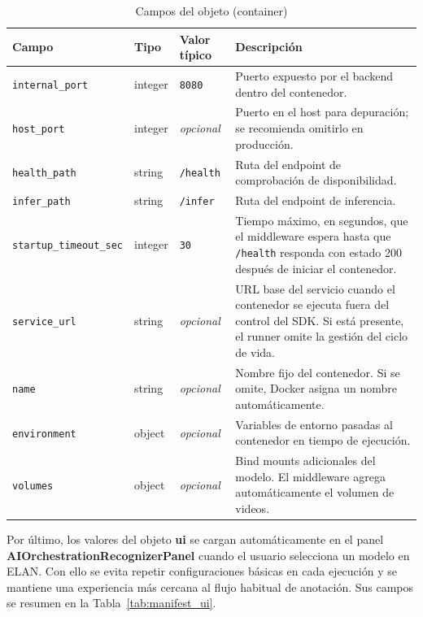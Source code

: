 \documentclass[11pt,a4paper]{article}
\begin{document}
\begin{table}[H]
\centering
\caption{Campos del objeto (container)}
\label{tab:manifest_container}
\scriptsize
\renewcommand{\arraystretch}{1.08}
\setlength{\tabcolsep}{3.5pt}

\begin{tabular}{
    >{\raggedright\arraybackslash}p{3.3cm}
    >{\raggedright\arraybackslash}p{1.5cm}
    >{\raggedright\arraybackslash}p{2.4cm}
    >{\raggedright\arraybackslash}p{6.0cm}
}
\toprule
\textbf{Campo} & \textbf{Tipo} & \textbf{Valor típico} & \textbf{Descripción} \\
\midrule
\texttt{internal\_port} & integer & \texttt{8080} & Puerto expuesto por el backend dentro del contenedor. \\
\texttt{host\_port} & integer & \textit{opcional} & Puerto en el host para depuración; se recomienda omitirlo en producción. \\
\texttt{health\_path} & string & \texttt{/health} & Ruta del endpoint de comprobación de disponibilidad. \\
\texttt{infer\_path} & string & \texttt{/infer} & Ruta del endpoint de inferencia. \\
\texttt{startup\_timeout\_sec} & integer & \texttt{30} & Tiempo máximo, en segundos, que el middleware espera hasta que \texttt{/health} responda con estado 200 después de iniciar el contenedor. \\
\texttt{service\_url} & string & \textit{opcional} & URL base del servicio cuando el contenedor se ejecuta fuera del control del SDK. Si está presente, el runner omite la gestión del ciclo de vida. \\
\texttt{name} & string & \textit{opcional} & Nombre fijo del contenedor. Si se omite, Docker asigna un nombre automáticamente. \\
\texttt{environment} & object & \textit{opcional} & Variables de entorno pasadas al contenedor en tiempo de ejecución. \\
\texttt{volumes} & object & \textit{opcional} & Bind mounts adicionales del modelo. El middleware agrega automáticamente el volumen de videos. \\
\bottomrule
\end{tabular}
\end{table}

Por último, los valores del objeto \textbf{ui} se cargan automáticamente en el panel \textbf{AIOrchestrationRecognizerPanel} cuando el usuario selecciona un modelo en ELAN. Con ello se evita repetir configuraciones básicas en cada ejecución y se mantiene una experiencia más cercana al flujo habitual de anotación. Sus campos se resumen en la Tabla~\ref{tab:manifest_ui}.
\end{document}

